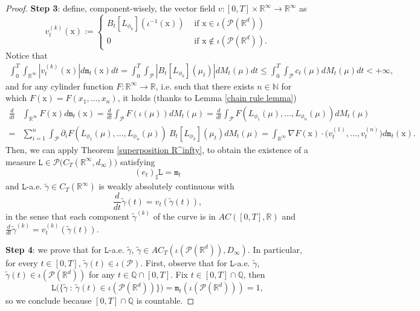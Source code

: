 \documentclass[10pt,leqno]{amsart}
\numberwithin{equation}{section}
\newcommand{\R}{\mathbb{R}}
\newcommand{\N}{\mathbb{N}}
\newcommand{\PP}{\mathcal{P}}
\begin{document}
\begin{proof}
    \textbf{Step 3}: define, component-wisely, the vector field $v:[0,T]\times \R^\infty \to \R^\infty$ as 
    \begin{equation}
        v_t^{(k)}(\mathrm{x}):=
        \begin{cases}
            B_t[L_{\phi_k}](\iota^{-1}(\mathrm{x})) & \text{ if }\mathrm{x}\in \iota(\PP(\R^d))
            \\
            0 & \text{ if }\mathrm{x}\notin \iota(\mathcal{P}(\R^d)).
        \end{cases}
    \end{equation}
    Notice that
    \begin{equation*}\label{eq: ineq superposition}
    \begin{aligned}
        \int_0^T\int_{\R^\infty}| v_t^{(k)}(\mathrm{x})|d\mathtt{m}_t(\mathrm{x}) dt
        =  
        \int_0^T \int_{\mathcal{P}}|B_t[L_{\phi_k}](\mu_t)|dM_t(\mu)dt
        \leq 
        \int_0^T \int_{\mathcal{P}} c_t(\mu)dM_t(\mu)dt<+\infty,
    \end{aligned} 
    \end{equation*}
    and for any cylinder function $F:\R^\infty\to \R$, i.e. such that there exists $n \in \N$ for which $F(\mathrm{x}) = F(x_1,\dots,x_n)$, it holds (thanks to Lemma \ref{chain rule lemma}) 
    \begin{align*}
        \frac{d}{dt}&\int_{\R^\infty} F(\mathrm{x})d\mathtt{m}_t(\mathrm{x}) 
        = 
        \frac{d}{dt} \int_{\mathcal{P}}F(\iota(\mu))dM_t(\mu) 
        = 
        \frac{d}{dt}\int_{\mathcal{P}}F(L_{\phi_1}(\mu),\dots,L_{\phi_n}(\mu)) dM_t(\mu)
        \\
        = & 
        \sum_{i=1}^n \int_{\mathcal{P}}\partial_i F(L_{\phi_1}(\mu),\dots,L_{\phi_n}(\mu)) \ B_t[L_{\phi_k}](\mu_t) dM_t(\mu) 
        =  
        \int_{\R^\infty}\nabla F(\mathrm{x}) \cdot \big( v_t^{(1)},\dots, v_t^{(n)}\big) d\mathtt{m}_t(\mathrm{x}).
   \end{align*}
   Then, we can apply Theorem \ref{superposition R^infty}, to obtain the existence of a measure $\mathtt{L} \in \mathcal{P}\big( C_T(\R^\infty,d_\infty) \big)$ satisfying
   \[(e_t)_\sharp \mathtt{L}  = \mathtt{m}_t\]
   and $\mathtt{L}$-a.e. $\tilde{\gamma} \in C_T(\R^\infty)$ is weakly absolutely continuous with
   \[\frac{d}{dt}\tilde{\gamma}(t) = v_t(\tilde{\gamma}(t)), \]
   in the sense that each component $\tilde{\gamma}^{(k)}$ of the curve is in $AC([0,T],\R)$ and $\frac{d}{dt}\tilde{\gamma}^{(k)} = v_t^{(k)}(\tilde{\gamma}(t))$.

    \textbf{Step 4}: we prove that for $\mathtt{L}$-a.e. $\tilde{\gamma}$, $\tilde{\gamma} \in AC_T(\iota(\PP(\R^d)), D_\infty)$. In particular, for every $t\in [0,T]$, $\tilde{\gamma}(t) \in \iota(\mathcal{P})$. First, observe that for $\mathtt{L}$-a.e. $\tilde\gamma$, $\tilde\gamma(t) \in \iota(\PP(\R^d))$ for any $t\in \mathbb{Q}\cap[0,T]$.
        Fix $t\in[0,T]\cap \mathbb{Q}$, then 
        \[\mathtt{L}\big( \{\tilde\gamma \ : \ \tilde\gamma(t)\in \iota(\PP(\R^d))\}\big) = \mathtt{m}_t(\iota(\PP(\R^d))) = 1,\]
        so we conclude because $[0,T]\cap\mathbb{Q}$ is countable.
        

\end{proof}
\end{document}
